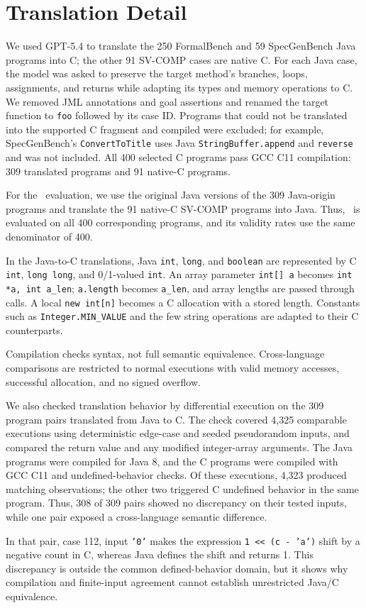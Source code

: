 \section{{Translation Detail}}
\label{app:benchmark-translation}

{We used GPT-5.4 to translate the 250 FormalBench and 59 SpecGenBench Java programs into C; the other 91 SV-COMP cases are native C. For each Java case, the model was asked to preserve the target method's branches, loops, assignments, and returns while adapting its types and memory operations to C. We removed JML annotations and goal assertions and renamed the target function to \texttt{foo} followed by its case ID. Programs that could not be translated into the supported C fragment and compiled were excluded; for example, SpecGenBench's \texttt{ConvertToTitle} uses Java \texttt{StringBuffer.append} and \texttt{reverse} and was not included. All 400 selected C programs pass GCC C11 compilation: 309 translated programs and 91 native-C programs.}

{For the \specgen\ evaluation, we use the original Java versions of the 309 Java-origin programs and translate the 91 native-C SV-COMP programs into Java. Thus, \specgen\ is evaluated on all 400 corresponding programs, and its validity rates use the same denominator of 400.}

{In the Java-to-C translations, Java \texttt{int}, \texttt{long}, and \texttt{boolean} are represented by C \texttt{int}, \texttt{long long}, and 0/1-valued \texttt{int}. An array parameter \texttt{int[] a} becomes \texttt{int *a, int a\_len}; \texttt{a.length} becomes \texttt{a\_len}, and array lengths are passed through calls. A local \texttt{new int[n]} becomes a C allocation with a stored length. Constants such as \texttt{Integer.MIN\_VALUE} and the few string operations are adapted to their C counterparts.}

{Compilation checks syntax, not full semantic equivalence. Cross-language comparisons are restricted to normal executions with valid memory accesses, successful allocation, and no signed overflow.}

{We also checked translation behavior by differential execution on the 309 program pairs translated from Java to C. The check covered 4,325 comparable executions using deterministic edge-case and seeded pseudorandom inputs, and compared the return value and any modified integer-array arguments. The Java programs were compiled for Java 8, and the C programs were compiled with GCC C11 and undefined-behavior checks. Of these executions, 4,323 produced matching observations; the other two triggered C undefined behavior in the same program. Thus, 308 of 309 pairs showed no discrepancy on their tested inputs, while one pair exposed a cross-language semantic difference.}

{In that pair, case 112, input \texttt{'0'} makes the expression \texttt{1 << (c - 'a')} shift by a negative count in C, whereas Java defines the shift and returns 1. This discrepancy is outside the common defined-behavior domain, but it shows why compilation and finite-input agreement cannot establish unrestricted Java/C equivalence.}
